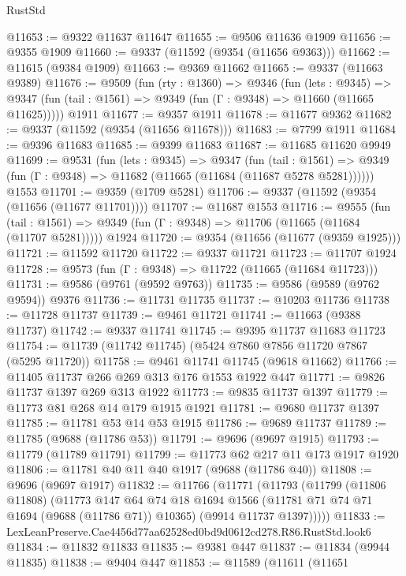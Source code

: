\begin{lexlean}{RustStd}
\begin{coremodule}
@11653 := @9322 @11637 @11647
@11655 := @9506 @11636 @1909
@11656 := @9355 @1909
@11660 := @9337 (@11592 (@9354 (@11656 @9363)))
@11662 := @11615 (@9384 @1909)
@11663 := @9369 @11662
@11665 := @9337 (@11663 @9389)
@11676 := @9509
    (fun (rty : @1360) =>
    @9346
      (fun (lets : @9345) =>
      @9347 (fun (tail : @1561) => @9349 (fun (Γ : @9348) => @11660 (@11665 @11625)))))
    @1911
@11677 := @9357 @1911
@11678 := @11677 @9362
@11682 := @9337 (@11592 (@9354 (@11656 @11678)))
@11683 := @7799 @1911
@11684 := @9396 @11683
@11685 := @9399 @11683
@11687 := @11685 @11620 @9949
@11699 := @9531
    (fun (lets : @9345) =>
    @9347
      (fun (tail : @1561) =>
      @9349 (fun (Γ : @9348) => @11682 (@11665 (@11684 (@11687 @5278 @5281))))))
    @1553
@11701 := @9359 (@1709 @5281)
@11706 := @9337 (@11592 (@9354 (@11656 (@11677 @11701))))
@11707 := @11687 @1553
@11716 := @9555
    (fun (tail : @1561) => @9349 (fun (Γ : @9348) => @11706 (@11665 (@11684 (@11707 @5281)))))
    @1924
@11720 := @9354 (@11656 (@11677 (@9359 @1925)))
@11721 := @11592 @11720
@11722 := @9337 @11721
@11723 := @11707 @1924
@11728 := @9573 (fun (Γ : @9348) => @11722 (@11665 (@11684 @11723)))
@11731 := @9586 (@9761 (@9592 @9763))
@11735 := @9586 (@9589 (@9762 @9594)) @9376
@11736 := @11731 @11735
@11737 := @10203 @11736
@11738 := @11728 @11737
@11739 := @9461 @11721
@11741 := @11663 (@9388 @11737)
@11742 := @9337 @11741
@11745 := @9395 @11737 @11683 @11723
@11754 := @11739 (@11742 @11745) (@5424 @7860 @7856 @11720 @7867 (@5295 @11720))
@11758 := @9461 @11741 @11745 (@9618 @11662)
@11766 := @11405 @11737 @266 @269 @313 @176 @1553 @1922 @447
@11771 := @9826 @11737 @1397 @269 @313 @1922
@11773 := @9835 @11737 @1397
@11779 := @11773 @81 @268 @14 @179 @1915 @1921
@11781 := @9680 @11737 @1397
@11785 := @11781 @53 @14 @53 @1915
@11786 := @9689 @11737
@11789 := @11785 (@9688 (@11786 @53))
@11791 := @9696 (@9697 @1915)
@11793 := @11779 (@11789 @11791)
@11799 := @11773 @62 @217 @11 @173 @1917 @1920
@11806 := @11781 @40 @11 @40 @1917 (@9688 (@11786 @40))
@11808 := @9696 (@9697 @1917)
@11832 := @11766
    (@11771
      (@11793
        (@11799
          (@11806 @11808)
          (@11773
            @147
            @64
            @74
            @18
            @1694
            @1566
            (@11781 @71 @74 @71 @1694 (@9688 (@11786 @71)) @10365)
            (@9914 @11737 @1397)))))
@11833 := LexLeanPreserve.Cae4456d77aa62528ed0bd9d0612cd278.R86.RustStd.look6
@11834 := @11832 @11833
@11835 := @9381 @447
@11837 := @11834 (@9944 @11835)
@11838 := @9404 @447
@11853 := @11589
    (@11611
      (@11651

\end{coremodule}
\end{lexlean}
